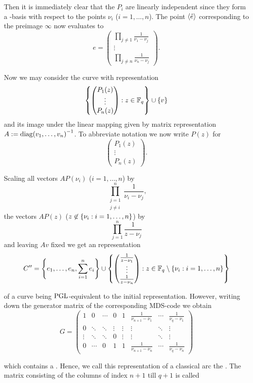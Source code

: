 Then it is immediately clear that the $P_i$ are linearly independent since they form a -basis with respect to the points $\nu_i$ ($i=1,\ldots,n$). The point $\gen{\hat{e}}$ corresponding to the preimage $\infty$ now evaluates to
$$ e = 
    \begin{pmatrix}
        \prod\limits_{j\neq 1}{\frac{1}{\nu_1-\nu_j}}\\
        \vdots               \\
        \prod\limits_{j\neq n}{\frac{1}{\nu_n-\nu_j}}
    \end{pmatrix}\textrm{.} $$

Now we may consider the curve with representation
$$ \left\{\begin{pmatrix} P_1(z)\\ \vdots\\ P_n(z)\end{pmatrix}:z\in\mathbb{F}_{q}\right\}\cup\left\{v\right\} $$
and its image under the linear mapping given by matrix representation $A:={\mathop\mathrm{diag}(v_1,\ldots,v_n)}^{-1}$.
To abbreviate notation we now write $P(z)$ for
$$ \begin{pmatrix} P_1(z)\\ \vdots\\ P_n(z)\end{pmatrix}\textrm{.} $$

Scaling all vectors $AP(\nu_i)$ ($i=1,\ldots,n$) by
$$ \prod_{\substack{j=1\\ j\neq i}}^n{\frac{1}{\nu_i-\nu_j}}\textrm{,} $$
the vectors $AP(z)$ ($z\not\in\left\{\nu_i:i=1,\ldots,n\right\}$) by 
$$ \prod_{j=1}^n{\frac{1}{z-\nu_j}} $$
and leaving $Av$ fixed we get an representation
$$ C'' = \left\{e_1,\ldots,e_n,\sum_{i=1}^n{e_i}\right\}\cup\left\{\begin{pmatrix} \frac{1}{z-\nu_1} \\ \vdots\\ \frac{1}{z-\nu_n}\end{pmatrix}:z\in\mathbb{F}_{q}\setminus\left\{\nu_i:i=1,\ldots,n\right\}\right\} $$

of a curve being $\mathrm{PGL}$-equivalent to the initial representation.
However, writing down the generator matrix of the corresponding MDS-code we obtain
$$ G =
    \begin{pmatrix}
        1      & 0      & \cdots & 0      & 1      & \frac{1}{\nu_{n+1}-\nu_1} & \cdots & \frac{1}{\nu_q-\nu_1} \\
        0      & \ddots & \ddots & \vdots & \vdots & \vdots                & \ddots & \vdots            \\
        \vdots & \ddots & \ddots & 0      & \vdots & \vdots                & \ddots & \vdots            \\
        0      & \cdots & 0      & 1      & 1      & \frac{1}{\nu_{n+1}-\nu_n} & \cdots & \frac{1}{\nu_q-\nu_n}
    \end{pmatrix} $$

which contains a . Hence, we call this representation of a classical arc the . The matrix consisting of the columns of index $n+1$ till $q+1$ is called \label{cauchy-rep}
